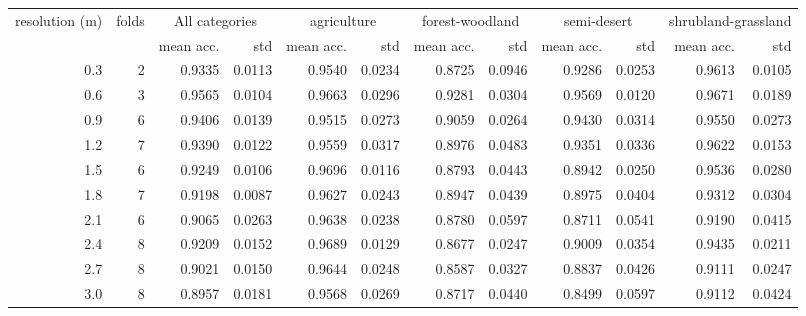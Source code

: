 \begin{tabular}{rrrrrrrrrrrr}
\toprule
resolution (m) &  folds & \multicolumn{2}{c}{All categories} & \multicolumn{2}{c}{agriculture} & \multicolumn{2}{c}{forest-woodland} & \multicolumn{2}{c}{semi-desert} & \multicolumn{2}{c}{shrubland-grassland} \\
           &  &     mean acc. &    std &                 mean acc. &    std &                     mean acc. &    std &                 mean acc. &    std &                         mean acc. &    std \\
\midrule
       0.3 &     2 &   0.9335 & 0.0113 &               0.9540 & 0.0234 &                   0.8725 & 0.0946 &               0.9286 & 0.0253 &                       0.9613 & 0.0105 \\
       0.6 &     3 &   0.9565 & 0.0104 &               0.9663 & 0.0296 &                   0.9281 & 0.0304 &               0.9569 & 0.0120 &                       0.9671 & 0.0189 \\
       0.9 &     6 &   0.9406 & 0.0139 &               0.9515 & 0.0273 &                   0.9059 & 0.0264 &               0.9430 & 0.0314 &                       0.9550 & 0.0273 \\
       1.2 &     7 &   0.9390 & 0.0122 &               0.9559 & 0.0317 &                   0.8976 & 0.0483 &               0.9351 & 0.0336 &                       0.9622 & 0.0153 \\
       1.5 &     6 &   0.9249 & 0.0106 &               0.9696 & 0.0116 &                   0.8793 & 0.0443 &               0.8942 & 0.0250 &                       0.9536 & 0.0280 \\
       1.8 &     7 &   0.9198 & 0.0087 &               0.9627 & 0.0243 &                   0.8947 & 0.0439 &               0.8975 & 0.0404 &                       0.9312 & 0.0304 \\
       2.1 &     6 &   0.9065 & 0.0263 &               0.9638 & 0.0238 &                   0.8780 & 0.0597 &               0.8711 & 0.0541 &                       0.9190 & 0.0415 \\
       2.4 &     8 &   0.9209 & 0.0152 &               0.9689 & 0.0129 &                   0.8677 & 0.0247 &               0.9009 & 0.0354 &                       0.9435 & 0.0211 \\
       2.7 &     8 &   0.9021 & 0.0150 &               0.9644 & 0.0248 &                   0.8587 & 0.0327 &               0.8837 & 0.0426 &                       0.9111 & 0.0247 \\
       3.0 &     8 &   0.8957 & 0.0181 &               0.9568 & 0.0269 &                   0.8717 & 0.0440 &               0.8499 & 0.0597 &                       0.9112 & 0.0424 \\

\end{tabular}
